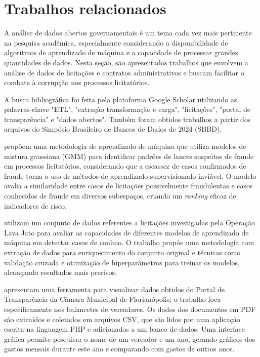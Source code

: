 \chapter{Trabalhos relacionados}

A análise de dados abertos governamentais é um tema cada vez mais pertinente na pesquisa acadêmica, especialmente considerando a disponibilidade de algoritmos de aprendizado de máquina e a capacidade de processar grandes quantidades de dados. Nesta seção, são apresentados trabalhos que envolvem a análise de dados de licitações e contratos administrativos e buscam facilitar o combate à corrupção nos processos licitatórios.

A busca bibliográfica foi feita pela plataforma Google Scholar utilizando as palavras-chave "ETL", "extração transformação e carga", "licitações", "portal de transparência" e "dados abertos". Também foram obtidos trabalhos a partir dos arquivos do Simpósio Brasileiro de Bancos de Dados de 2024 (SBBD).

\cite{schmitz2024sbbd} propõem uma metodologia de aprendizado de máquina que utiliza modelos de mistura gaussiana (GMM) para identificar padrões de lances suspeitos de fraude em processos licitatórios, considerando que a escassez de casos confirmados de fraude torna o uso de métodos de aprendizado supervisionado inviável. O modelo avalia a similaridade entre casos de licitações possivelmente fraudulentas e casos conhecidos de fraude em diversos subespaços, criando um \textit{ranking} eficaz de indicadores de risco.

\cite{schneider2024sbbd} utilizam um conjunto de dados referentes a licitações investigadas pela Operação Lava Jato para avaliar as capacidades de diferentes modelos de aprendizado de máquina em detectar casos de conluio. O trabalho propõe uma metodologia com extração de dados para enriquecimento do conjunto original e técnicas como validação cruzada e otimização de hiperparâmetros para treinar os modelos, alcançando resultados mais precisos.

\cite{santos2021ferramenta} apresentam uma ferramenta para visualizar dados obtidos do Portal de Transparência da Câmara Municipal de Florianópolis; o trabalho foca especificamente nos balancetes de vereadores. Os dados dos documentos em PDF são extraídos e coletados em arquivos CSV, que são lidos por uma aplicação escrita na linguagem PHP e adicionados a um banco de dados. Uma interface gráfica permite pesquisar o nome de um vereador e um ano, gerando gráficos dos gastos mensais durante este ano e comparando com gastos de outros anos.

